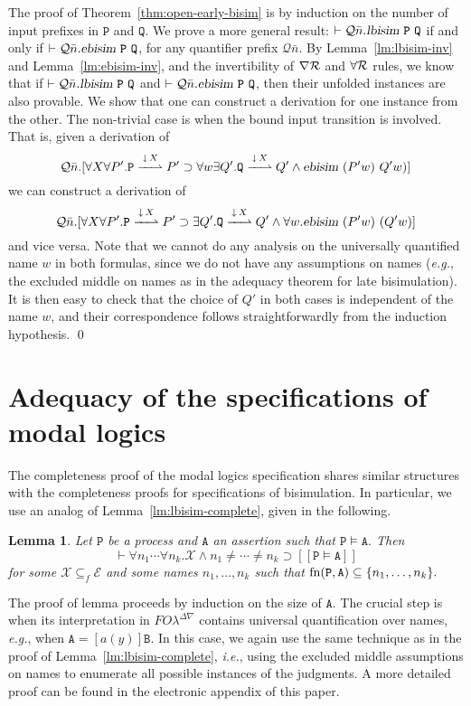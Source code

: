 \documentclass{acmtrans2m}
\newtheorem{lemma}[theorem]{Lemma}
\newcommand{\ie}{{\em i.e.}}
\newcommand{\eg}{{\em e.g.}}
\newcommand \mBox[1] {[#1]}
\def\Escr{{\mathcal E}}
\def\Qscr{{\mathcal Q}}
\def\Xscr{{\mathcal X}}
\def\Api{{\mathtt A}}
\def\Bpi{{\mathtt B}}
\def\Ppi{{\mathtt P}}
\def\Qpi{{\mathtt Q}}
\newcommand{\FOL   }{FO\lambda}
\newcommand{\FOLDNb}{\FOL^{\Delta\nabla}}
\newcommand{\ebisim}[2]{\hbox{\sl ebisim}~#1~#2}
\newcommand{\lbisim}[2]{\hbox{\sl lbisim}~#1~#2}
\newcommand{\forallR}{\forall{\cal R}}
\newcommand{\inact}{\mathop{\downarrow}}
\newcommand{\nablaR}{\nabla{\cal R}}
\newcommand{\oimp}{\supset}
\newcommand{\onep }[3]{#1\stackrel{#2}{-\!\!-\!\!\!\rightharpoonup} #3}
\newcommand{\trans}[1]{[\![ #1 ]\!]}
\newcommand{\fn}[1]{{\rm fn}(#1)}
\begin{document}
The proof of Theorem~\ref{thm:open-early-bisim} is by induction on the
number of input prefixes in $\Ppi$ and $\Qpi.$ 
We prove a more general result: $\vdash \Qscr \bar n. \lbisim \Ppi \Qpi$
if and only if $\vdash \Qscr \bar n. \ebisim \Ppi \Qpi$, for any 
quantifier prefix $\Qscr \bar n.$
By Lemma~\ref{lm:lbisim-inv} and Lemma~\ref{lm:ebisim-inv}, and the invertibility of $\nablaR$ and $\forallR$
rules, we know that if $\vdash \Qscr \bar n.\lbisim \Ppi \Qpi$
and $\vdash \Qscr \bar n. \ebisim \Ppi \Qpi$, then their unfolded instances
are also provable. We show that one can construct a derivation for one instance
from the other. The non-trivial case is when the bound input transition is 
involved. That is, given a derivation of
$$
\Qscr \bar n. [\forall X \forall P'. \onep{\Ppi}{\inact X}{P'}
\oimp \forall w \exists Q'. \onep{\Qpi}{\inact X}{Q'} \land \ebisim {(P'w)}{Q'w)}]
$$
we can construct a derivation of
$$
\Qscr \bar n. [\forall X \forall P'. \onep{\Ppi}{\inact X}{P'}
\oimp \exists Q'. \onep{\Qpi}{\inact X}{Q'} \land \forall w. \ebisim {(P'w)}{(Q'w)}]
$$
and vice versa. Note that we cannot do any analysis on the universally quantified
name $w$ in both formulas, since we do not have any assumptions on names
(\eg, the excluded middle on names as in the adequacy theorem for late bisimulation).
It is then easy to check that the choice of $Q'$ in both cases is independent of
the name $w$, and their correspondence follows straightforwardly from the induction
hypothesis.
\qed

\section{Adequacy of the specifications of modal logics}


The completeness proof of the modal logics specification shares similar structures
with the completeness proofs for specifications of bisimulation. 
In particular, we use an analog of Lemma~\ref{lm:lbisim-complete}, given in the following. 
\begin{lemma}
\label{lm:modal-complete}
Let $\Ppi$ be a process and $\Api$ an assertion such that $\Ppi \models \Api.$
Then 
$$
\vdash \forall n_1 \cdots \forall n_k. \Xscr \land n_1 \not = \cdots \not = n_k \oimp \trans {\Ppi \models \Api}
$$
for some $\Xscr \subseteq_f \Escr$ and some names $n_1, \ldots , n_k$
such that $\fn{\Ppi, \Api} \subseteq \{n_1,\ldots, n_k \}.$
\end{lemma}
The proof of lemma proceeds by induction on the size of $\Api$. The crucial
step is when its interpretation in $\FOLDNb$ contains universal quantification
over names, \eg, when $\Api = \mBox{a(y)}\Bpi$. In this case, we again
use the same technique as in the proof of Lemma~\ref{lm:lbisim-complete}, \ie,
using the excluded middle assumptions on names to enumerate all possible
instances of the judgments. A more detailed proof can be found in the electronic
appendix of this paper.
\end{document}
